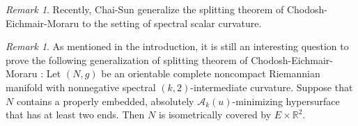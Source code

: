 \documentclass[11pt,letterpaper]{amsart}
\theoremstyle{definition}
\theoremstyle{remark}
\newtheorem{remark}[theorem]{Remark}
\numberwithin{equation}{section}
\begin{document}
\begin{remark}
    Recently, Chai-Sun \cite[Theorem 1.3]{chai-sun-spectralscalarsplitting} generalize the splitting theorem of Chodosh-Eichmair-Moraru \cite{chodoshsplittingtheorem} to the setting of spectral scalar curvature.
\end{remark}

\begin{remark}
    As mentioned in the introduction, it is still an interesting question to prove the following generalization of splitting theorem of Chodosh-Eichmair-Moraru \cite{chodoshsplittingtheorem}: Let $(N,g)$ be an orientable complete noncompact Riemannian manifold with nonnegative spectral $(k,2)$-intermediate curvature. Suppose that $N$ contains a properly embedded, absolutely $\mathcal{A}_k(u)$-minimizing hypersurface that has at least two ends. Then $N$ is isometrically covered by $E\times \mathbb{R}^2$.
\end{remark}
\end{document}

